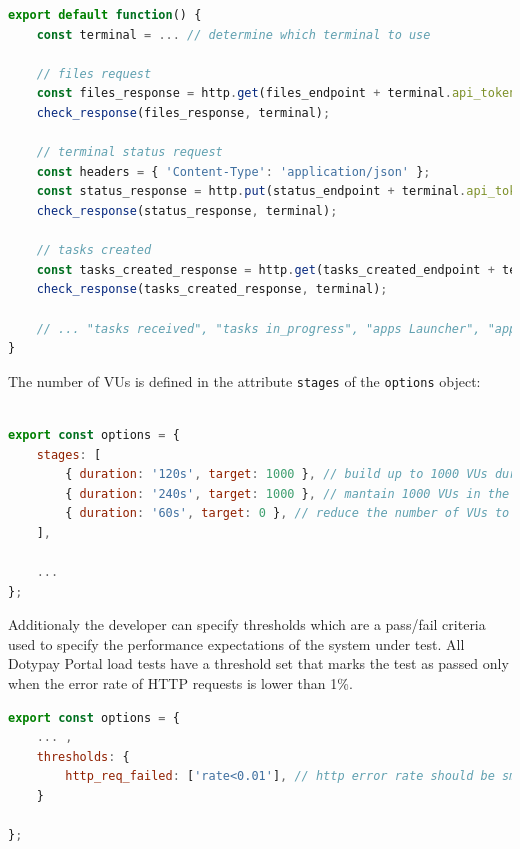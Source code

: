 \documentclass[12pt, a4paper]{article}
\begin{document}
\begin{lstlisting}[language=JavaScript, caption={Definition of first three HTTP requests calls in the Terminal synchronization benchmark scenario},captionpos=b]
export default function() {
    const terminal = ... // determine which terminal to use 

    // files request
    const files_response = http.get(files_endpoint + terminal.api_token);
    check_response(files_response, terminal);

    // terminal status request
    const headers = { 'Content-Type': 'application/json' };
    const status_response = http.put(status_endpoint + terminal.api_token, JSON.stringify(status_endpoint_body), { headers: headers });
    check_response(status_response, terminal);

    // tasks created
    const tasks_created_response = http.get(tasks_created_endpoint + terminal.api_token);
    check_response(tasks_created_response, terminal);

    // ... "tasks received", "tasks in_progress", "apps Launcher", "apps Mandatory" and "apps optional" HTTP requests
}
\end{lstlisting}

The number of VUs is defined in the attribute \texttt{stages} of the \texttt{options} object:

\begin{lstlisting}[language=JavaScript, caption={Definition of the number of VUs during a load test},captionpos=b]

export const options = {
    stages: [
        { duration: '120s', target: 1000 }, // build up to 1000 VUs during the first two minutes
        { duration: '240s', target: 1000 }, // mantain 1000 VUs in the next four minutes
        { duration: '60s', target: 0 }, // reduce the number of VUs to zero in the next minute and finish the test
    ],

    ...
};

\end{lstlisting}

Additionaly the developer can specify thresholds which are a pass/fail criteria used to specify the performance expectations of the system under test.
All Dotypay Portal load tests have a threshold set that marks the test as passed only when the error rate of HTTP requests is lower than 1\%.

\begin{lstlisting}[language=JavaScript, caption={Threshold configuration for created load tests},captionpos=b]
export const options = {
    ... ,
    thresholds: {
        http_req_failed: ['rate<0.01'], // http error rate should be smaller than 1%
    }
    
};
\end{lstlisting}
\end{document}

